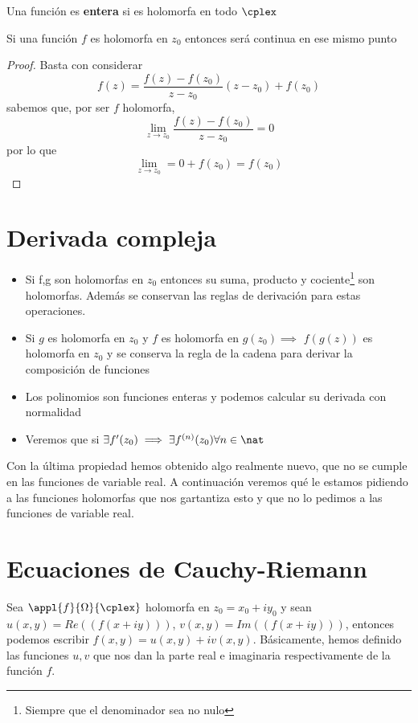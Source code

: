 \documentclass{apuntes}
\begin{document}
\begin{defn}
Una función es \textbf{entera} si es holomorfa en todo $\cplex$
\end{defn}

\begin{prop}
Si una función $f$ es holomorfa en $z_0$ entonces será continua en ese mismo punto
\end{prop}
\begin{proof}
Basta con considerar
\[f(z)=\frac{f(z)-f(z_0)}{z-z_0}(z-z_0)+f(z_0)\]
sabemos que, por ser $f$ holomorfa,
\[\lim_{z \to z_0}\frac{f(z)-f(z_0)}{z-z_0} = 0\]
por lo que
\[\lim_{z \to z_0} = 0+f(z_0)=f(z_0)\]
\end{proof}

\section{Derivada compleja}
\begin{itemize}
\item Si f,g son holomorfas en $z_0$ entonces su suma, producto y cociente\footnote{Siempre que el denominador sea no nulo} son holomorfas. Además se conservan las reglas de derivación para estas operaciones.

\item Si $g$ es holomorfa en $z_0$ y $f$ es holomorfa en $g(z_0) \implies$ $f(g(z))$ es holomorfa en $z_0$ y se conserva la regla de la cadena para derivar la composición de funciones

\item Los polinomios son funciones enteras y podemos calcular su derivada con normalidad

\item Veremos que si $\exists f'(z_0) \implies \exists f^{(n)}(z_0) \forall n \in \nat$
\end{itemize}

Con la última propiedad hemos obtenido algo realmente nuevo, que no se cumple en las funciones de variable real. A continuación veremos qué le estamos pidiendo a las funciones holomorfas que nos gartantiza esto y que no lo pedimos a las funciones de variable real.


\section{Ecuaciones de Cauchy-Riemann}
Sea $\appl{f}{\Omega}{\cplex}$ holomorfa en $z_0=x_0+iy_0$ y sean $u(x,y)=Re((f(x+iy)))$, $v(x,y)=Im((f(x+iy)))$, entonces podemos escribir $f(x,y)=u(x,y)+iv(x,y)$. Básicamente, hemos definido las funciones $u,v$ que nos dan la parte real e imaginaria respectivamente de la función $f$.
\end{document}
